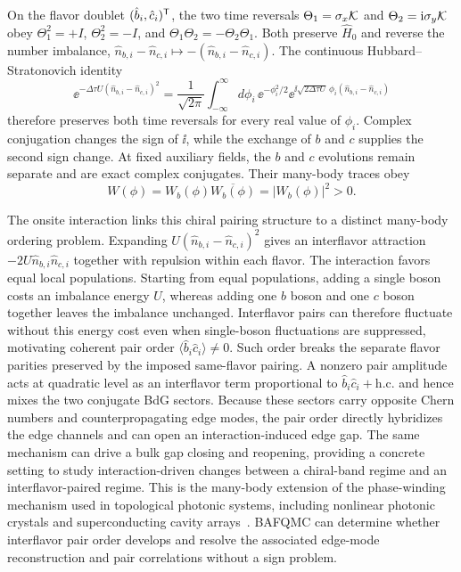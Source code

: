 On the flavor doublet $(\hat b_i,\hat c_i)^{\mathsf{T}}$, the two time reversals $\Theta_1=\sigma_x\mathcal{K}$ and $\Theta_2=\mathrm{i}\sigma_y\mathcal{K}$ obey $\Theta_1^2=+I$, $\Theta_2^2=-I$, and $\Theta_1\Theta_2=-\Theta_2\Theta_1$. Both preserve $\hat H_0$ and reverse the number imbalance, $\hat n_{b,i}-\hat n_{c,i}\mapsto-(\hat n_{b,i}-\hat n_{c,i})$.
The continuous Hubbard--Stratonovich identity
\begin{equation}
    \ee^{-\Delta\tau U(\hat n_{b,i}-\hat n_{c,i})^2}
    =\frac{1}{\sqrt{2\pi}}
    \int_{-\infty}^{\infty}d\phi_i\,\ee^{-\phi_i^2/2}
    \ee^{\ii\sqrt{2\Delta\tau U}\,\phi_i
      (\hat n_{b,i}-\hat n_{c,i})}
    \label{eq:trs_conjugate_BdG_relative_density_HS}
\end{equation}
therefore preserves both time reversals for every real value of $\phi_i$. Complex conjugation changes the sign of $\ii$, while the exchange of $b$ and $c$ supplies the second sign change. At fixed auxiliary fields, the \(b\) and \(c\) evolutions remain separate and are exact complex conjugates. Their many-body traces obey
\begin{equation}
    W(\phi)=W_b(\phi)\overline{W_b(\phi)}
    =|W_b(\phi)|^2>0.
    \label{eq:trs_conjugate_BdG_weight}
\end{equation}

The onsite interaction links this chiral pairing structure to a distinct many-body ordering problem. Expanding $U(\hat n_{b,i}-\hat n_{c,i})^2$ gives an interflavor attraction $-2U\hat n_{b,i}\hat n_{c,i}$ together with repulsion within each flavor. The interaction favors equal local populations. Starting from equal populations, adding a single boson costs an imbalance energy $U$, whereas adding one $b$ boson and one $c$ boson together leaves the imbalance unchanged. Interflavor pairs can therefore fluctuate without this energy cost even when single-boson fluctuations are suppressed, motivating coherent pair order $\langle\hat b_i\hat c_i\rangle\ne0$. Such order breaks the separate flavor parities preserved by the imposed same-flavor pairing. A nonzero pair amplitude acts at quadratic level as an interflavor term proportional to $\hat b_i\hat c_i+\mathrm{h.c.}$ and hence mixes the two conjugate BdG sectors. Because these sectors carry opposite Chern numbers and counterpropagating edge modes, the pair order directly hybridizes the edge channels and can open an interaction-induced edge gap. The same mechanism can drive a bulk gap closing and reopening, providing a concrete setting to study interaction-driven changes between a chiral-band regime and an interflavor-paired regime. This is the many-body extension of the phase-winding mechanism used in topological photonic systems, including nonlinear photonic crystals and superconducting cavity arrays~\cite{peanoHoudeBrendel2016squeezing,bardynKarzigRefaelLiew2016bogoliubov,peanoHoudeMarquardt2016topological}. BAFQMC can determine whether interflavor pair order develops and resolve the associated edge-mode reconstruction and pair correlations without a sign problem.

